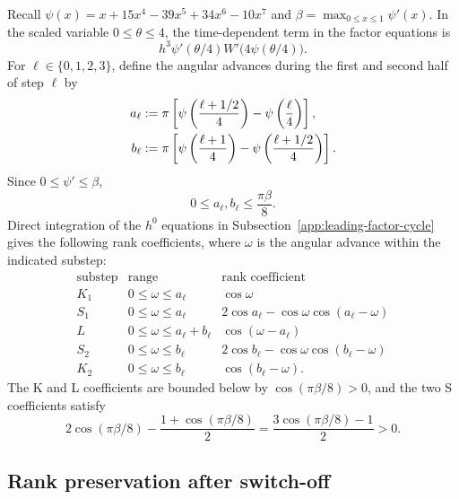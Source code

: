 \documentclass[]{article}
\numberwithin{equation}{section}
\theoremstyle{plain}
\theoremstyle{remark}
\begin{document}
Recall
\(
 \psi(x)=x+15x^4-39x^5+34x^6-10x^7
\)
and \(\beta=\max_{0\le x\le1}\psi'(x)\).  In the scaled variable
\(0\le\theta\le4\), the time-dependent term in the factor equations is
\begin{equation}\label{eq:switch-off-scaled}
 h^3\psi'(\theta/4)W'\bigl(4\psi(\theta/4)\bigr).
\end{equation}
For \(\ell\in\{0,1,2,3\}\), define the angular advances during the
first and second half of step \(\ell\) by
\begin{align}
 a_\ell&:=\pi\left[
 \psi\left(\frac{\ell+1/2}{4}\right)
 -\psi\left(\frac{\ell}{4}\right)\right],\notag\\
 b_\ell&:=\pi\left[
 \psi\left(\frac{\ell+1}{4}\right)
 -\psi\left(\frac{\ell+1/2}{4}\right)\right].
 \label{eq:switch-off-half-step-angles}
\end{align}
Since \(0\le\psi'\le\beta\),
\begin{equation}\label{eq:reduction-angular-increments}
 0\le a_\ell,b_\ell\le\frac{\pi\beta}{8}.
\end{equation}
Direct integration of the $h^0$ equations in
Subsection~\ref{app:leading-factor-cycle} gives the following rank
coefficients, where \(\omega\) is the angular advance within the
indicated substep:
\begin{equation}\label{eq:reduction-rank-coefficients}
\begin{array}{c|c|c}
\text{substep}&\text{range}&\text{rank coefficient}\\
\hline
K_1&0\le\omega\le a_\ell&\cos\omega\\
S_1&0\le\omega\le a_\ell&2\cos a_\ell-\cos\omega\cos(a_\ell-\omega)\\
L&0\le\omega\le a_\ell+b_\ell&\cos(\omega-a_\ell)\\
S_2&0\le\omega\le b_\ell&2\cos b_\ell-\cos\omega\cos(b_\ell-\omega)\\
K_2&0\le\omega\le b_\ell&\cos(b_\ell-\omega).
\end{array}
\end{equation}
The K and L coefficients are bounded below by
\(\cos(\pi\beta/8)>0\), and the two S coefficients satisfy
\begin{equation}\label{eq:reduction-rank-margin}
 2\cos(\pi\beta/8)-\frac{1+\cos(\pi\beta/8)}2
 =\frac{3\cos(\pi\beta/8)-1}{2}>0.
\end{equation}

\subsection{Rank preservation after switch-off}
\label{app:post-switch-rank}
\end{document}
